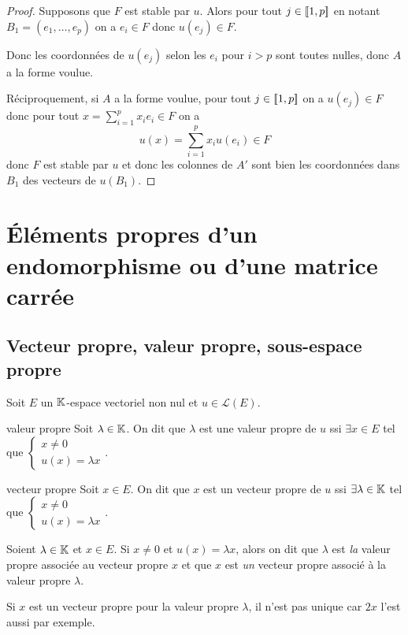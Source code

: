 \begin{proof}
    Supposons que $F$ est stable par $u$. Alors pour tout $j \in [\![1, p]\!] $ en notant 
    $B_1 = (e_1, \ldots, e_p)$ on a $e_i \in F$ donc $u(e_j) \in F$. 

    Donc les coordonnées de $u(e_j)$ selon les $e_i$ pour $i > p$ sont toutes nulles, donc 
    $A$ a la forme voulue.

    \lvspace Réciproquement, si $A$ a la forme voulue, pour tout $j \in [\![1, p]\!]$ on a
    $u(e_j) \in F$ donc pour tout $x = \sum_{i = 1}^p x_i e_i \in F$ on a
    \[
        u(x) = \sum_{i = 1}^p x_i u(e_i) \in F
    \]
    donc $F$ est stable par $u$ et donc les colonnes de $A'$ sont bien les coordonnées dans $B_1$ 
    des vecteurs de $u(B_1)$.
\end{proof}


\section{\'Eléments propres d'un endomorphisme ou d'une matrice carrée }
\subsection{Vecteur propre, valeur propre, sous-espace propre }

Soit $E$ un $\mathbb{K}$-espace vectoriel non nul et $u \in \mathscr L(E)$.

\begin{definition}{valeur propre}{}
    Soit $\lambda \in \mathbb{K}$. On dit que $\lambda$ est une valeur propre de $u$ ssi
    $\exists x \in E$ tel que $\begin{cases} x \neq 0 \\ u(x) = \lambda x \end{cases}$.
\end{definition}

\begin{definition}{vecteur propre}{}
    Soit $x \in E$. On dit que $x$ est un vecteur propre de $u$ ssi
    $\exists \lambda \in \mathbb{K}$ tel que $\begin{cases} x \neq 0 \\ u(x) = \lambda x \end{cases}$.
\end{definition}

\begin{remarque}
    Soient $\lambda \in \mathbb{K}$ et $x \in E$. Si $x \neq 0$ et $u(x) = \lambda x$, alors 
    on dit que $\lambda$ est \emph{la} valeur propre associée au vecteur propre $x$ et 
    que $x$ est \emph{un} vecteur propre associé à la valeur propre $\lambda$.

    Si $x$ est un vecteur propre pour la valeur propre $\lambda$, il n'est pas unique 
    car $2x$ l'est aussi par exemple.
\end{remarque}

